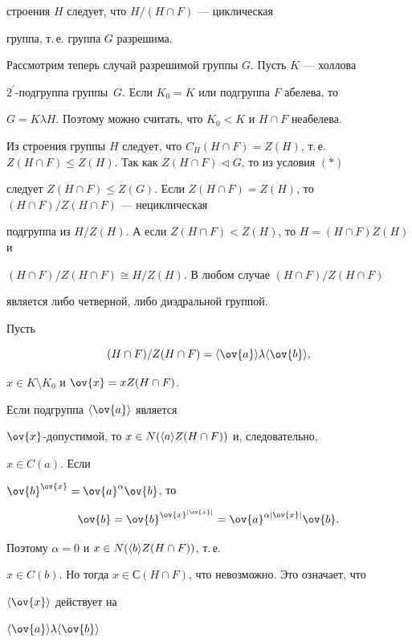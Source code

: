 \begin{pf}
строения $H$ следует, что $H/(H\cap F)$ --- циклическая


группа, т.\,е. группа $G$ разрешима.





Рассмотрим теперь случай разрешимой группы $G$. Пусть $K$ --- холлова


$2^\prime$-подгруппа группы~$G$. Если $K_0=K$ или подгруппа $F$ абелева, то


$G=K\lambda H$. Поэтому можно считать, что $K_0<K$ и $H\cap F$ неабелева.


Из строения группы $H$ следует, что $C_H(H\cap F)=Z(H)$, т.\,е. $Z(H\cap F)\le


Z(H)$. Так как $Z(H\cap F)\triangleleft G$, то из условия $(\ast)$


следует $Z(H\cap F)\le


Z(G)$. Если $Z(H\cap F)=Z(H)$, то $(H\cap F)/Z(H\cap F)$ --- нециклическая


подгруппа из $H/Z(H)$. А если $Z(H\cap F)<Z(H)$, то $H=(H\cap F)Z(H)$ и


$(H\cap F)/Z(H\cap F)\cong H/Z(H)$. В любом случае $(H\cap F)/Z(H\cap F)$


является либо четверной, либо диэдральной группой.


Пусть


$$


(H\cap F)/Z(H\cap F)=\ls\ov{a}\ps\lambda\ls\ov{b}\ps,


$$


$x\in K\setminus K_0$ и $\ov{x}=xZ(H\cap F)$.


Если подгруппа $\ls\ov{a}\ps$ является


$\ov{x}$-допустимой, то $x\in N(\langle a\rangle Z(H\cap F))$ и, следовательно,


$x\in C(a)$. Если


$\ov{b}^{\ov{x}}=\ov{a}^{\alpha}\ov{b}$, то


$$


\ov{b}=\ov{b}^{\ov{x}^{|\ov{x}|}}=


\ov{a}^{\alpha|\ov{x}|}\ov{b}.


$$


Поэтому $\alpha =0$ и $x\in


N(\ls b\ps Z(H\cap F))$, т.\,е.


$x\in C(b)$. Но тогда $x\in С(H\cap F)$, что невозможно. Это означает, что


$\ls\ov{x}\ps$ действует на


$\ls\ov{a}\ps\lambda\ls\ov{b}\ps$



\end{pf}
